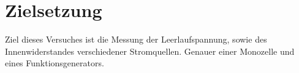 \section{Zielsetzung}
\label{sec:Ziel}
Ziel dieses Versuches ist die Messung der Leerlaufspannung,
sowie des Innenwiderstandes verschiedener Stromquellen.
Genauer einer Monozelle und eines Funktionsgenerators.
